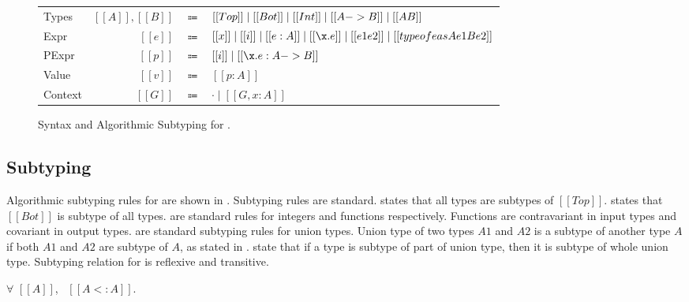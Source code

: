 \begin{figure}[t]
  \begin{small}
    \centering
    \begin{tabular}{lrcl} \toprule
      Types & $[[A]], [[B]]$ & $\Coloneqq$ & $ [[Top]] \mid [[Bot]] \mid [[Int]] \mid [[A -> B]] \mid [[A \/ B]] $ \\
      Expr & $[[e]]$ & $\Coloneqq$ & $[[x]] \mid [[i]] \mid [[e:A]] \mid [[\x.e]] \mid [[e1 e2]] \mid [[typeof e as A e1 B e2]]$\\
      PExpr & $[[p]]$ & $\Coloneqq$ & $[[i]] \mid [[\x.e : A -> B]] $\\
      Value & $[[v]]$ & $\Coloneqq$ & $[[p:A]]$\\
      Context & $[[G]]$ & $\Coloneqq$ & $ \cdot \mid [[G , x : A]]$ \\
      \bottomrule
    \end{tabular}
  \end{small}
  \begin{small}
    \centering
  \end{small}
  \caption{Syntax and Algorithmic Subtyping for \cal.}
  \label{fig:union:syntax}
\end{figure}

\subsection{Subtyping}
\label{sec:union:sub}
Algorithmic subtyping rules for \cal are shown in . Subtyping rules are standard.
 states that all types are subtypes of $[[Top]]$.  states that $[[Bot]]$ is
subtype of all types.  are standard rules for integers and functions respectively.
Functions are contravariant in input types and covariant in output types.  are
standard subtyping rules for union types. Union type of two types $A1$ and $A2$ is a subtype of another
type $A$ if both $A1$ and $A2$ are subtype of $A$, as stated in .  state
that if a type is subtype of part of union type, then it is subtype of whole union type.
Subtyping relation for \cal is reflexive and transitive.

\begin{lemma}
  $\forall$ $[[A]]$, \ $[[A <: A]]$.
\label{lemma:union:refl}
\end{lemma}

